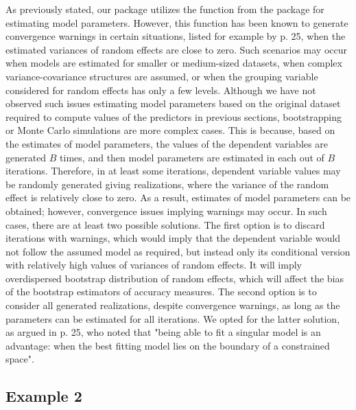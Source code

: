 As previously stated, our package utilizes the  function from the  package for estimating model parameters. However, this function has been known to generate convergence warnings in certain situations,  listed for example by \cite{lme4} p. 25, when the estimated variances of random effects are close to zero. Such scenarios may occur when models are estimated for smaller or medium-sized datasets, when complex variance-covariance structures are assumed, or when the grouping variable considered for random effects has only a few levels. Although we have not observed such issues estimating model parameters based on the original dataset required to compute values of the predictors in previous sections, bootstrapping or Monte Carlo simulations are more complex cases. This is because, based on the estimates of model parameters, the values of the dependent variables are generated $B$ times, and then model parameters are estimated in each out of $B$ iterations. Therefore, in at least some iterations, dependent variable values may be randomly generated giving realizations, where the variance of the random effect is relatively close to zero. As a result, estimates of model parameters can be obtained; however, convergence issues implying warnings may occur. In such cases, there are at least two possible solutions. The first option is to discard iterations with warnings, which would imply that the dependent variable would not follow the assumed model as required, but instead only its conditional version with relatively high values of variances of random effects. It will imply overdispersed bootstrap distribution of random effects, which will affect the bias of the bootstrap estimators of accuracy measures. The second option is to consider all generated realizations, despite convergence warnings, as long as the parameters can be estimated for all iterations. We opted for the latter solution, as argued in \cite{lme4} p. 25, who noted that "being able to fit a singular model is an advantage: when the best fitting model lies on the boundary of a constrained space".



\subsection{Example 2}



